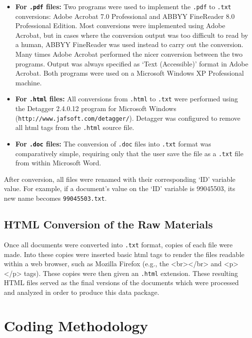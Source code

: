 \documentclass[11pt]{article}
\begin{document}
\begin{itemize}
	\item \textbf{For \texttt{.pdf} files:} Two programs were used to implement the \texttt{.pdf} to \texttt{.txt} conversions: Adobe Acrobat 7.0 Professional and ABBYY FineReader 8.0 Professional Edition. Most conversions were implemented using Adobe Acrobat, but in cases where the conversion output was too difficult to read by a human, ABBYY FineReader was used instead to carry out the conversion. Many times Adobe Acrobat performed the nicer conversion between the two programs. Output was always specified as `Text (Accessible)' format in Adobe Acrobat. Both programs were used on a Microsoft Windows XP Professional machine.
	\item \textbf{For \texttt{.html} files:} All conversions from \texttt{.html} to \texttt{.txt} were performed using the Detagger 2.4.0.12 program for Microsoft Windows (\texttt{http://www.jafsoft.com/detagger/}). Detagger was configured to remove all html tags from the \texttt{.html} source file.
	\item \textbf{For \texttt{.doc} files:} The conversion of \texttt{.doc} files into \texttt{.txt} format was comparatively simple, requiring only that the user save the file as a \texttt{.txt} file from within Microsoft Word.
\end{itemize}

After conversion, all files were renamed with their corresponding `ID' variable value. For example, if a document's value on the `ID' variable is 99045503, its new name becomes \texttt{99045503.txt}.

\subsection{HTML Conversion of the Raw Materials}

Once all documents were converted into \texttt{.txt} format, copies of each file were made.  Into these copies were inserted basic html tags to render the files readable within a web browser, such as Mozilla Firefox (e.g., the <br></br> and <p></p> tags).  These copies were then given an \texttt{.html} extension.  These resulting HTML files served as the final versions of the documents which were processed and analyzed in order to produce this data package.

\section{Coding Methodology}
\end{document}
